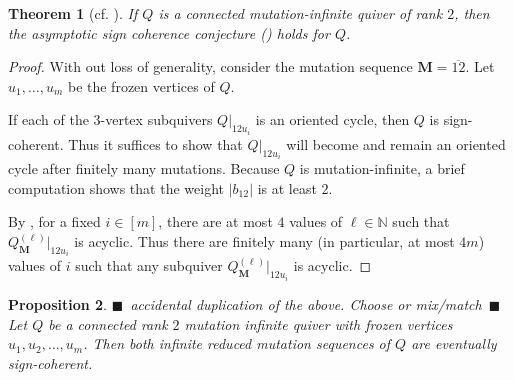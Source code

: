 \documentclass[12pt]{amsart}
\def\AB#1{(\textcolor{blue}{#1})}
\newcommand{\cS}[1]{{\noindent\textsf{\color{purple}$\blacksquare$~#1~$\blacksquare$}}}
\newtheorem{thm}{Theorem}[section]
\newtheorem{prop}[thm]{Proposition}
\theoremstyle{definition}
\theoremstyle{remark}
\numberwithin{equation}{section}
\newcommand{\N} { \mathbb{N}}
\begin{document}
\begin{thm}[cf. {\cite[Theorem 3.5]{GekhtmanNakanishi}}]
  If $Q$ is a connected mutation-infinite quiver of rank $2$,  then the asymptotic sign coherence conjecture () holds for $Q$.  %
\end{thm} 
\begin{proof}
 With out loss of generality, consider the mutation sequence $\mathbf M = \overline{12}$. Let $u_1,\dots,u_m$ be the frozen vertices of $Q$.  



If each of the $3$-vertex subquivers $Q|_{12u_i}$ is an oriented cycle, then $Q$ is sign-coherent.
Thus it suffices to show that $Q|_{12u_i}$ will become and remain an oriented cycle after finitely many mutations.
Because $Q$ is mutation-infinite, a brief computation shows that the weight $|b_{12}|$ is at least $2$.

By , for a fixed $i \in [m]$, there are at most $4$ values of $\ell \in \N$ such that $Q_{\mathbf M}^{(\ell)}|_{12u_i}$ is acyclic.  Thus there are finitely many (in particular, at most $4m$) values of $i$ such that any subquiver $Q_{\mathbf M}^{(\ell)}|_{12u_i}$ is acyclic.  
\end{proof}

\iffalse
\begin{prop}
\label{prop: rank 2 eventually sign coherent}
\cS{accidental duplication of the above. Choose or mix/match}
Let $Q$ be a connected rank $2$ mutation infinite quiver with frozen vertices $u_1,u_2,\ldots,u_m$. Then both infinite reduced mutation sequences of $Q$ are eventually sign-coherent.
\end{prop}
\end{document}

